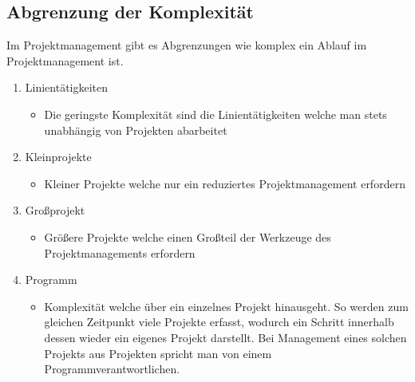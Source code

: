 \documentclass{article}
\begin{document}
	\subsection{Abgrenzung der Komplexität}
	Im Projektmanagement gibt es Abgrenzungen wie komplex ein Ablauf im Projektmanagement ist.
	\begin{enumerate}
		\item{Linientätigkeiten}
		\begin{itemize}
			\item{Die geringste Komplexität sind die Linientätigkeiten welche man stets unabhängig von Projekten abarbeitet}
		\end{itemize}
		\item{Kleinprojekte}
		\begin{itemize}
			\item{Kleiner Projekte welche nur ein reduziertes Projektmanagement erfordern}
		\end{itemize}
		\item{Großprojekt}
		\begin{itemize}
			\item{Größere Projekte welche einen Großteil der Werkzeuge des Projektmanagements erfordern}
		\end{itemize}
		\item{Programm}
		\begin{itemize}
			\item{Komplexität welche über ein einzelnes Projekt hinausgeht. So werden zum gleichen Zeitpunkt viele Projekte erfasst, wodurch ein Schritt innerhalb dessen wieder ein eigenes Projekt darstellt. Bei Management eines solchen Projekts aus Projekten spricht man von einem Programmverantwortlichen.}
		\end{itemize}
	\end{enumerate}
\end{document}
